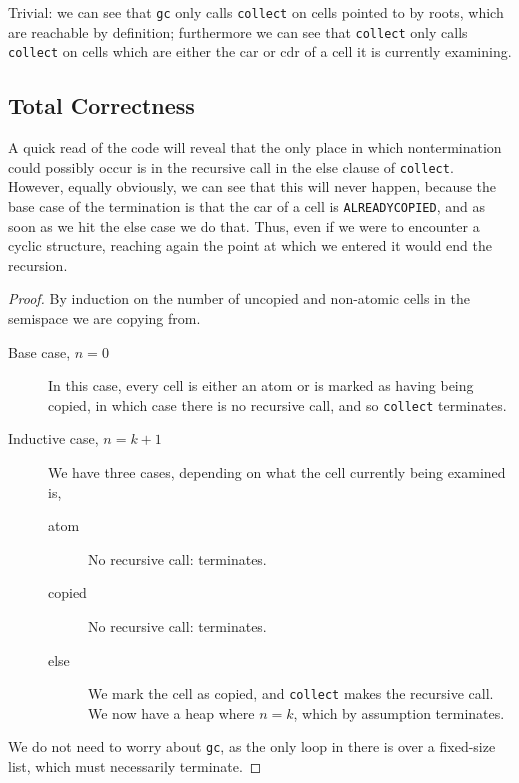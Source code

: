 \begin{lemma}
  \label{lem:c-example-unreach}
  Trivial: we can see that \texttt{gc} only calls \texttt{collect} on
  cells pointed to by roots, which are reachable by definition;
  furthermore we can see that \texttt{collect} only calls
  \texttt{collect} on cells which are either the car or cdr of a cell
  it is currently examining.
\end{lemma}

\subsection{Total Correctness}
\label{sec:copying-example-total}

A quick read of the code will reveal that the only place in which
nontermination could possibly occur is in the recursive call in the
else clause of \texttt{collect}. However, equally obviously, we can
see that this will never happen, because the base case of the
termination is that the car of a cell is \texttt{ALREADYCOPIED}, and
as soon as we hit the else case we do that. Thus, even if we were to
encounter a cyclic structure, reaching again the point at which we
entered it would end the recursion.

\begin{proof}
  By induction on the number of uncopied and non-atomic cells in the
  semispace we are copying from.

  \begin{description}
  \item[Base case, $n = 0$] In this case, every cell is either an atom
    or is marked as having being copied, in which case there is no
    recursive call, and so \texttt{collect} terminates.

  \item[Inductive case, $n = k + 1$] We have three cases, depending on
    what the cell currently being examined is,

    \begin{description}
    \item[atom] No recursive call: terminates.
    \item[copied] No recursive call: terminates.
    \item[else] We mark the cell as copied, and \texttt{collect} makes
      the recursive call. We now have a heap where $n = k$, which by
      assumption terminates.
    \end{description}
  \end{description}

  We do not need to worry about \texttt{gc}, as the only loop in there
  is over a fixed-size list, which must necessarily terminate.
\end{proof}


